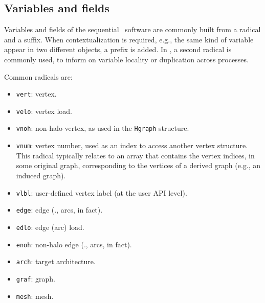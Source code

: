 \subsection{Variables and fields}
\label{sec-naming-variables}

Variables and fields of the sequential \scotch\ software are commonly
built from a radical and a suffix. When contextualization is required,
e.g., the same kind of variable appear in two different objects, a
prefix is added. In \ptscotch, a second radical is commonly used, to
inform on variable locality or duplication across processes.

Common radicals are:
\begin{itemize}
\item
\texttt{vert}: vertex.
\item
\texttt{velo}: vertex load.
\item
\texttt{vnoh}: non-halo vertex, as used in the \texttt{Hgraph}
structure.
\item
\texttt{vnum}: vertex number, used as an index to access another vertex
structure. This radical typically relates to an array that contains
the vertex indices, in some original graph, corresponding to the
vertices of a derived graph (e.g., an induced graph).
\item
\texttt{vlbl}: user-defined vertex label (at the user API level).
\item
\texttt{edge}: edge (\ie., arcs, in fact).
\item
\texttt{edlo}: edge (arc) load.
\item
\texttt{enoh}: non-halo edge (\ie., arcs, in fact).
\item
\texttt{arch}: target architecture.
\item
\texttt{graf}: graph.
\item
\texttt{mesh}: mesh.
\end{itemize}

